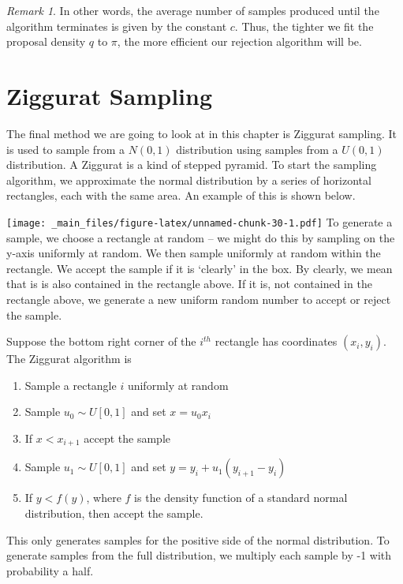 \documentclass[
]{book}
\providecommand{\tightlist}{%
  \setlength{\itemsep}{0pt}\setlength{\parskip}{0pt}}
\theoremstyle{definition}
\theoremstyle{definition}
\theoremstyle{definition}
\theoremstyle{definition}
\theoremstyle{remark}
\newtheorem*{remark}{Remark}
\begin{document}
\begin{remark}
In other words, the average number of samples produced until the algorithm terminates is given by the constant \(c\). Thus, the tighter we fit the proposal density \(q\) to \(\pi\), the more efficient our rejection algorithm will be.
\end{remark}

\hypertarget{ziggurat-sampling}{%
\section{Ziggurat Sampling}\label{ziggurat-sampling}}

The final method we are going to look at in this chapter is Ziggurat sampling. It is used to sample from a \(N(0, 1)\) distribution using samples from a \(U(0, 1)\) distribution. A Ziggurat is a kind of stepped pyramid. To start the sampling algorithm, we approximate the normal distribution by a series of horizontal rectangles, each with the same area. An example of this is shown below.

\texttt{[image: \_main\_files/figure-latex/unnamed-chunk-30-1.pdf]}
To generate a sample, we choose a rectangle at random -- we might do this by sampling on the y-axis uniformly at random. We then sample uniformly at random within the rectangle. We accept the sample if it is `clearly' in the box. By clearly, we mean that is is also contained in the rectangle above. If it is, not contained in the rectangle above, we generate a new uniform random number to accept or reject the sample.

Suppose the bottom right corner of the \(i^{th}\) rectangle has coordinates \((x_i, y_i)\). The Ziggurat algorithm is

\begin{enumerate}
\def\labelenumi{\arabic{enumi}.}
\tightlist
\item
  Sample a rectangle \(i\) uniformly at random
\item
  Sample \(u_0 \sim U[0, 1]\) and set \(x = u_0x_i\)
\item
  If \(x < x_{i+1}\) accept the sample
\item
  Sample \(u_1 \sim U[0, 1]\) and set \(y = y_i + u_1(y_{i+1} − y_i)\)
\item
  If \(y < f(y)\), where \(f\) is the density function of a standard normal distribution, then accept the sample.
\end{enumerate}

This only generates samples for the positive side of the normal distribution. To generate samples from the full distribution, we multiply each sample by -1 with probability a half.
\end{document}
